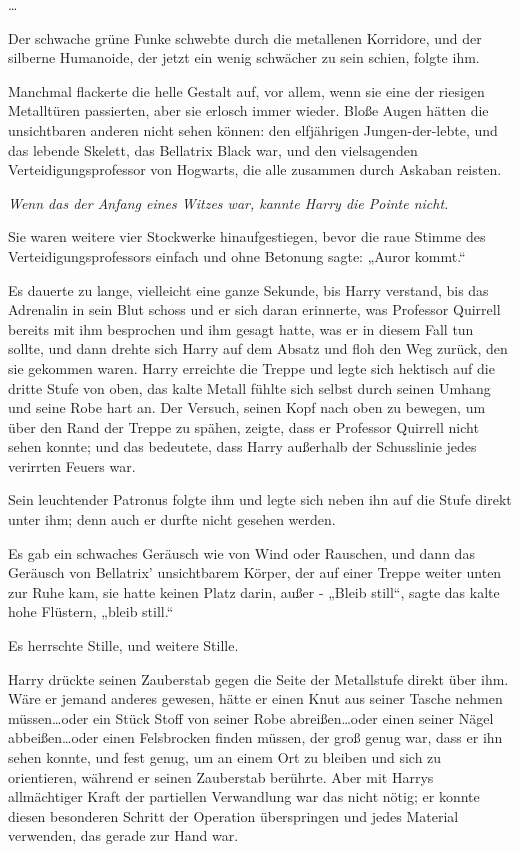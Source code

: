 {…

Der schwache grüne Funke schwebte durch die metallenen Korridore, und der silberne Humanoide, der jetzt ein wenig schwächer zu sein schien, folgte ihm.

Manchmal flackerte die helle Gestalt auf, vor allem, wenn sie eine der riesigen Metalltüren passierten, aber sie erlosch immer wieder. Bloße Augen hätten die unsichtbaren anderen nicht sehen können: den elfjährigen Jungen-der-lebte, und das lebende Skelett, das Bellatrix Black war, und den vielsagenden Verteidigungsprofessor von Hogwarts, die alle zusammen durch Askaban reisten.

\emph{Wenn das der Anfang eines Witzes war, kannte Harry die Pointe nicht.}

Sie waren weitere vier Stockwerke hinaufgestiegen, bevor die raue Stimme des Verteidigungsprofessors einfach und ohne Betonung sagte: „Auror kommt.“

Es dauerte zu lange, vielleicht eine ganze Sekunde, bis Harry verstand, bis das Adrenalin in sein Blut schoss und er sich daran erinnerte, was Professor Quirrell bereits mit ihm besprochen und ihm gesagt hatte, was er in diesem Fall tun sollte, und dann drehte sich Harry auf dem Absatz und floh den Weg zurück, den sie gekommen waren. Harry erreichte die Treppe und legte sich hektisch auf die dritte Stufe von oben, das kalte Metall fühlte sich selbst durch seinen Umhang und seine Robe hart an. Der Versuch, seinen Kopf nach oben zu bewegen, um über den Rand der Treppe zu spähen, zeigte, dass er Professor Quirrell nicht sehen konnte; und das bedeutete, dass Harry außerhalb der Schusslinie jedes verirrten Feuers war.

Sein leuchtender Patronus folgte ihm und legte sich neben ihn auf die Stufe direkt unter ihm; denn auch er durfte nicht gesehen werden.

Es gab ein schwaches Geräusch wie von Wind oder Rauschen, und dann das Geräusch von Bellatrix' unsichtbarem Körper, der auf einer Treppe weiter unten zur Ruhe kam, sie hatte keinen Platz darin, außer - „Bleib still“, sagte das kalte hohe Flüstern, „bleib still.“

Es herrschte Stille, und weitere Stille.

Harry drückte seinen Zauberstab gegen die Seite der Metallstufe direkt über ihm. Wäre er jemand anderes gewesen, hätte er einen Knut aus seiner Tasche nehmen müssen…oder ein Stück Stoff von seiner Robe abreißen…oder einen seiner Nägel abbeißen…oder einen Felsbrocken finden müssen, der groß genug war, dass er ihn sehen konnte, und fest genug, um an einem Ort zu bleiben und sich zu orientieren, während er seinen Zauberstab berührte. Aber mit Harrys allmächtiger Kraft der partiellen Verwandlung war das nicht nötig; er konnte diesen besonderen Schritt der Operation überspringen und jedes Material verwenden, das gerade zur Hand war.

}
